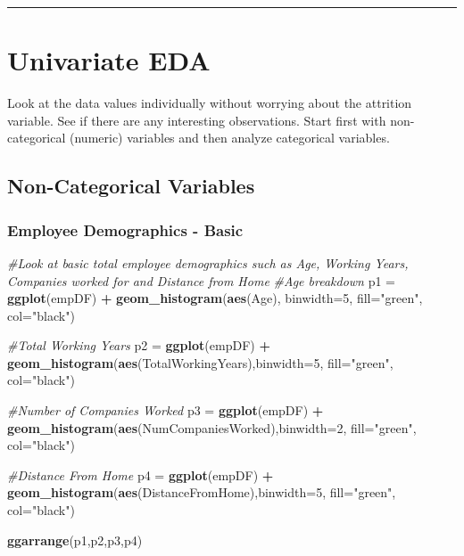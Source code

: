 \documentclass[]{article}
\newenvironment{Shaded}{\begin{snugshade}}{\end{snugshade}}
\newcommand{\KeywordTok}[1]{\textcolor[rgb]{0.13,0.29,0.53}{\textbf{#1}}}
\newcommand{\DataTypeTok}[1]{\textcolor[rgb]{0.13,0.29,0.53}{#1}}
\newcommand{\DecValTok}[1]{\textcolor[rgb]{0.00,0.00,0.81}{#1}}
\newcommand{\StringTok}[1]{\textcolor[rgb]{0.31,0.60,0.02}{#1}}
\newcommand{\CommentTok}[1]{\textcolor[rgb]{0.56,0.35,0.01}{\textit{#1}}}
\newcommand{\OperatorTok}[1]{\textcolor[rgb]{0.81,0.36,0.00}{\textbf{#1}}}
\newcommand{\NormalTok}[1]{#1}
\begin{document}
\begin{center}\rule{0.5\linewidth}{\linethickness}\end{center}

\section{Univariate EDA}\label{univariate-eda}

Look at the data values individually without worrying about the
attrition variable. See if there are any interesting observations. Start
first with non-categorical (numeric) variables and then analyze
categorical variables.

\subsection{Non-Categorical Variables}\label{non-categorical-variables}

\subsubsection{Employee Demographics -
Basic}\label{employee-demographics---basic}

\begin{Shaded}
\begin{Highlighting}[]
\CommentTok{#Look at basic total employee demographics such as Age, Working Years, Companies worked for and Distance from Home}
\CommentTok{#Age breakdown}
\NormalTok{p1 =}\StringTok{ }\KeywordTok{ggplot}\NormalTok{(empDF) }\OperatorTok{+}\StringTok{ }\KeywordTok{geom_histogram}\NormalTok{(}\KeywordTok{aes}\NormalTok{(Age), }\DataTypeTok{binwidth=}\DecValTok{5}\NormalTok{, }\DataTypeTok{fill=}\StringTok{"green"}\NormalTok{, }\DataTypeTok{col=}\StringTok{"black"}\NormalTok{)}

\CommentTok{#Total Working Years}
\NormalTok{p2 =}\StringTok{ }\KeywordTok{ggplot}\NormalTok{(empDF) }\OperatorTok{+}\StringTok{ }\KeywordTok{geom_histogram}\NormalTok{(}\KeywordTok{aes}\NormalTok{(TotalWorkingYears),}\DataTypeTok{binwidth=}\DecValTok{5}\NormalTok{, }\DataTypeTok{fill=}\StringTok{"green"}\NormalTok{, }\DataTypeTok{col=}\StringTok{"black"}\NormalTok{)}

\CommentTok{#Number of Companies Worked}
\NormalTok{p3 =}\StringTok{ }\KeywordTok{ggplot}\NormalTok{(empDF) }\OperatorTok{+}\StringTok{ }\KeywordTok{geom_histogram}\NormalTok{(}\KeywordTok{aes}\NormalTok{(NumCompaniesWorked),}\DataTypeTok{binwidth=}\DecValTok{2}\NormalTok{, }\DataTypeTok{fill=}\StringTok{"green"}\NormalTok{, }\DataTypeTok{col=}\StringTok{"black"}\NormalTok{)}

\CommentTok{#Distance From Home}
\NormalTok{p4 =}\StringTok{ }\KeywordTok{ggplot}\NormalTok{(empDF) }\OperatorTok{+}\StringTok{ }\KeywordTok{geom_histogram}\NormalTok{(}\KeywordTok{aes}\NormalTok{(DistanceFromHome),}\DataTypeTok{binwidth=}\DecValTok{5}\NormalTok{, }\DataTypeTok{fill=}\StringTok{"green"}\NormalTok{, }\DataTypeTok{col=}\StringTok{"black"}\NormalTok{)}

\KeywordTok{ggarrange}\NormalTok{(p1,p2,p3,p4)}
\end{Highlighting}
\end{Shaded}
\end{document}
